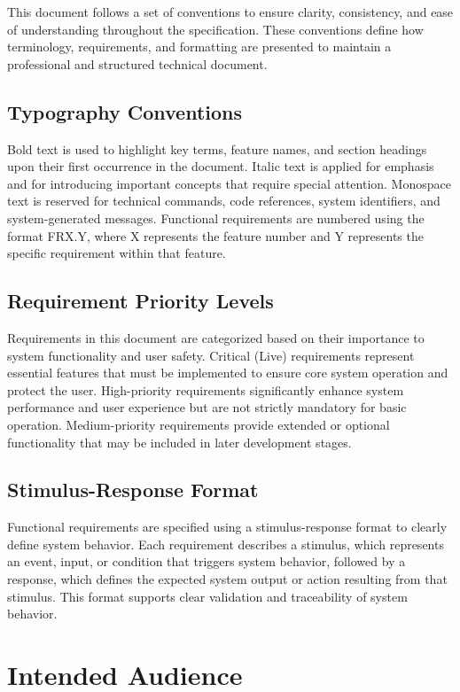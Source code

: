 This document follows a set of conventions to ensure clarity, consistency, and ease of understanding throughout the specification. These conventions define how terminology, requirements, and formatting are presented to maintain a professional and structured technical document.

\subsection{Typography Conventions}

Bold text is used to highlight key terms, feature names, and section headings upon their first occurrence in the document. Italic text is applied for emphasis and for introducing important concepts that require special attention. Monospace text is reserved for technical commands, code references, system identifiers, and system-generated messages. Functional requirements are numbered using the format FRX.Y, where X represents the feature number and Y represents the specific requirement within that feature.

\subsection{Requirement Priority Levels}

Requirements in this document are categorized based on their importance to system functionality and user safety. Critical (Live) requirements represent essential features that must be implemented to ensure core system operation and protect the user. High-priority requirements significantly enhance system performance and user experience but are not strictly mandatory for basic operation. Medium-priority requirements provide extended or optional functionality that may be included in later development stages.

\subsection{Stimulus-Response Format}

Functional requirements are specified using a stimulus-response format to clearly define system behavior. Each requirement describes a stimulus, which represents an event, input, or condition that triggers system behavior, followed by a response, which defines the expected system output or action resulting from that stimulus. This format supports clear validation and traceability of system behavior.

\section{Intended Audience}

